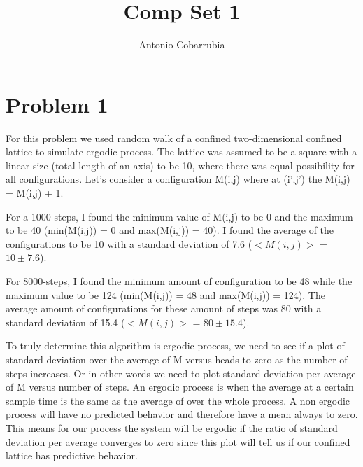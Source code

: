 \documentclass[a4paper]{article}
\title{Comp Set 1}
\author[1]{Antonio Cobarrubia}
\affil[1]{Department of Physics, San Diego State University, San Diego, CA 92182}
\date{}
\theoremstyle{definition}
\begin{document}
\maketitle

\doublespacing


\section{Problem 1}
For this problem we used random walk of a confined two-dimensional confined lattice to simulate ergodic process. The lattice was assumed to be a square with a linear size (total length of an axis) to be 10, where there was equal possibility for all configurations. Let's consider a configuration M(i,j) where at (i',j') the M(i,j) = M(i,j) + 1.

For a 1000-steps, I found the minimum value of M(i,j) to be 0 and the maximum to be 40 (min(M(i,j)) = 0 and max(M(i,j)) = 40). I found the average of the configurations to be 10 with a standard deviation of 7.6 ($<M(i,j)>$ = $10 \pm 7.6$).

For 8000-steps, I found the minimum amount of configuration to be 48 while the maximum value to be 124 (min(M(i,j)) = 48 and max(M(i,j)) = 124). The average amount of configurations for these amount of steps was 80 with a standard deviation of 15.4 ($<M(i,j)>$ = $80 \pm 15.4$).

To truly determine this algorithm is ergodic process, we need to see if a plot of standard deviation over the average of M versus heads to zero as the number of steps increases. Or in other words we need to plot standard deviation per average of M versus number of steps. An ergodic process is when the average at a certain sample time is the same as the average of over the whole process. A non ergodic process will have no predicted behavior and therefore have a mean always to zero. This means for our process the system will be ergodic if the ratio of standard deviation per average converges to zero since this plot will tell us if our confined lattice has predictive behavior.
\end{document}
